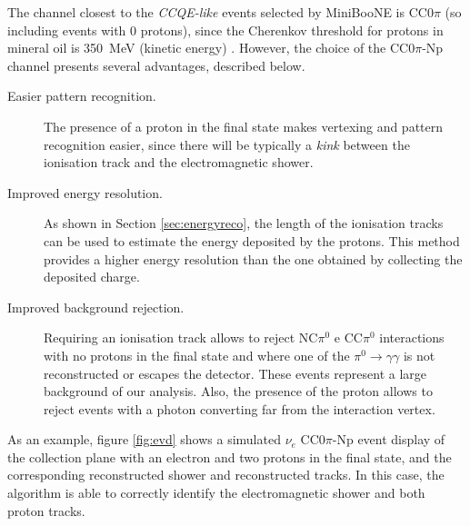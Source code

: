 The channel closest to the \emph{CCQE-like} events selected by MiniBooNE is CC0$\pi$ (so including events with 0 protons), since the Cherenkov threshold for protons in mineral oil is 350~MeV (kinetic energy) \cite{Perevalov:2009mn}.
However, the choice of the CC0$\pi$-Np channel presents several advantages, described below.
\begin{description}
    \item[Easier pattern recognition.] The presence of a proton in the final state makes vertexing and pattern recognition easier, since there will be typically a \emph{kink} between the ionisation track and the electromagnetic shower.
    \item[Improved energy resolution.] As shown in Section \ref{sec:energyreco}, the length of the ionisation tracks can be used to estimate the energy deposited by the protons. This method provides a higher energy resolution than the one obtained by collecting the deposited charge.
    \item[Improved background rejection.] Requiring an ionisation track allows to reject NC$\pi^0$ e CC$\pi^0$ interactions with no protons in the final state and where one of the $\pi^0\rightarrow\gamma\gamma$ is not reconstructed or escapes the detector. These events represent a large background of our analysis. Also, the presence of the proton allows to reject events with a photon converting far from the interaction vertex.
\end{description}


As an example, figure \ref{fig:evd} shows a simulated $\nu_{e}$ CC0$\pi$-Np event display of the collection plane with an electron and two protons in the final state, and the corresponding reconstructed shower and reconstructed tracks. In this case, the algorithm is able to correctly identify the electromagnetic shower and both proton tracks.

